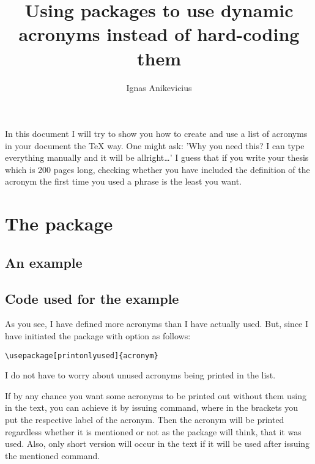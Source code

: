 \documentclass[
]{scrartcl}
\title{Using packages to use dynamic acronyms instead of hard-coding them}
\author{Ignas Anikevicius}
\begin{document}
\maketitle
\tableofcontents
\listoftodos{\vskip 1em}

%
In this document I will try to show you how to create and use a list of acronyms
    in your document the \TeX{} way.
%
One might ask: 'Why you need this? I can type everything manually and it will be
    allright\ldots'
%
I guess that if you write your thesis which is 200 pages long, checking whether
    you have included the definition of the acronym the first time you used a
    phrase is the least you want.

\section{The  package}

%
\subsection{An example}

%


%
\subsection{Code used for the example}

%


%
As you see, I have defined more acronyms than I have actually used.
%
But, since I have initiated the package with  option as
    follows:
\begin{lstlisting}
\usepackage[printonlyused]{acronym}
\end{lstlisting}
    I do not have to worry about unused acronyms being printed in the list.

%
If by any chance you want some acronyms to be printed out without them using in
    the text, you can achieve it by issuing  command, where in
    the brackets you put the respective label of the acronym.
%
Then the acronym will be printed regardless whether it is mentioned or
    not as the package will think, that it was used.
%
Also, only short version will occur in the text if it will be used after issuing
    the mentioned command.
\end{document}
